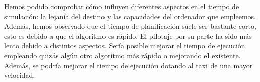 Hemos podido comprobar cómo influyen diferentes aspectos en el tiempo de simulación: la lejanía del destino y las capacidades del ordenador que empleemos. Además, hemos observado que el tiempo de planificación suele ser bastante corto, esto es debido a que el algoritmo es rápido. El pilotaje por su parte ha sido más lento debido a distintos aspectos. Sería posible mejorar el tiempo de ejecución empleando quizás algún otro algoritmo más rápido o mejorando el existente. Además, se podría mejorar el tiempo de ejecución dotando al taxi de una mayor velocidad.